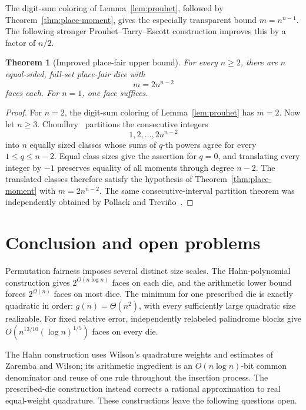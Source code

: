 \documentclass[11pt]{article}
\newtheorem{theorem}{Theorem}[section]
\theoremstyle{definition}
\theoremstyle{remark}
\begin{document}
The digit-sum coloring of Lemma~\ref{lem:prouhet}, followed by
Theorem~\ref{thm:place-moment}, gives the especially transparent bound
\(m=n^{n-1}\).  The following stronger Prouhet--Tarry--Escott construction
improves this by a factor of \(n/2\).

\begin{theorem}[Improved place-fair upper bound]\label{thm:place-prouhet}
For every \(n\geq2\), there are \(n\) equal-sided, full-set place-fair dice
with
\[
  m=2n^{n-2}
\]
faces each.  For \(n=1\), one face suffices.
\end{theorem}

\begin{proof}
For \(n=2\), the digit-sum coloring of Lemma~\ref{lem:prouhet} has \(m=2\).
Now let \(n\geq3\).  Choudhry~\cite[Theorem~6]{choudhry2020} partitions the
consecutive integers
\[
  1,2,\ldots,2n^{n-2}
\]
into \(n\) equally sized classes whose sums of \(q\)-th powers agree for
every \(1\leq q\leq n-2\).  Equal class sizes give the assertion for
\(q=0\), and translating every integer by \(-1\) preserves equality of all
moments through degree \(n-2\).  The translated classes therefore satisfy
the hypothesis of Theorem~\ref{thm:place-moment} with \(m=2n^{n-2}\).
The same consecutive-interval partition theorem was independently obtained
by Pollack and Trevi\~no~\cite{pollack-trevino2026}.
\end{proof}



\section{Conclusion and open problems}\label{sec:open}

Permutation fairness imposes several distinct size scales. The
Hahn-polynomial construction gives \(2^{O(n\log n)}\) faces on each die,
and the arithmetic lower bound forces \(2^{\Omega(n)}\) faces on most
dice. The minimum for one prescribed die is exactly quadratic in order:
\(g(n)=\Theta(n^2)\), with every sufficiently large quadratic size
realizable. For fixed relative error, independently relabeled palindrome
blocks give \(O(n^{13/10}(\log n)^{1/5})\) faces on every die.

The Hahn construction uses Wilson's quadrature weights and estimates of
Zaremba and Wilson; its arithmetic ingredient is an \(O(n\log n)\)-bit
common denominator and reuse of one rule throughout the insertion process.
The prescribed-die construction instead corrects a rational approximation
to real equal-weight quadrature. These constructions leave the following
questions open.
\end{document}
